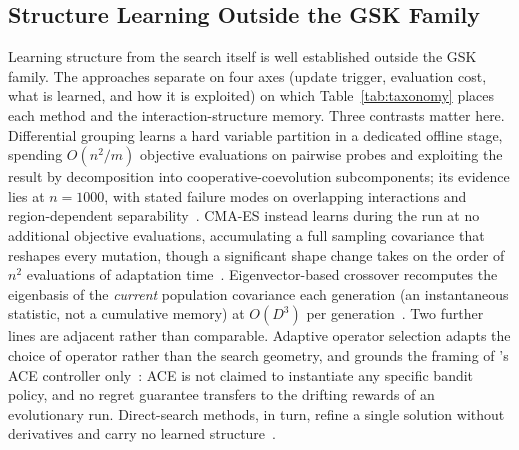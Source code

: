 \subsection{Structure Learning Outside the GSK Family}\label{sec:rel:structure}

Learning structure from the search itself is well established outside
the GSK family. The approaches separate on four axes (update trigger,
evaluation cost, what is learned, and how it is exploited) on which
Table~\ref{tab:taxonomy} places each method and the interaction-structure
memory. Three contrasts matter here. Differential grouping learns a hard
variable partition in a dedicated offline stage, spending $O(n^2/m)$ objective
evaluations on pairwise probes and exploiting the result by decomposition into
cooperative-coevolution subcomponents; its evidence lies at $n = 1000$, with
stated failure modes on overlapping interactions and region-dependent
separability~\cite{omidvar2014dg}. %
CMA-ES instead learns during the run at no additional objective evaluations,
accumulating a full sampling covariance that reshapes every mutation, though a
significant shape change takes on the order of $n^2$ evaluations of adaptation
time~\cite{hansen2001cmaes}. %
Eigenvector-based crossover recomputes the eigenbasis of the \emph{current}
population covariance each generation (an instantaneous statistic, not a
cumulative memory) at $O(D^3)$ per generation~\cite{guo2015eig}. %
Two further lines are adjacent rather than comparable. Adaptive operator
selection adapts the choice of operator rather than the search geometry, and
grounds the framing of \dtgsk{}'s ACE controller
only~\cite{fialho2010adaptive,auer2002finite}: ACE is not claimed to
instantiate any specific bandit policy, and no regret guarantee transfers to
the drifting rewards of an evolutionary run. Direct-search methods, in turn,
refine a single solution without derivatives and carry no learned
structure~\cite{kolda2003directsearch,nelder1965simplex}.

